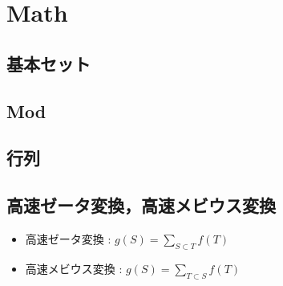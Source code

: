 \section{Math}

\subsection{基本セット}


\subsection{Mod}


\subsection{行列}



\subsection{高速ゼータ変換，高速メビウス変換}
\begin{itemize}
  \item 高速ゼータ変換 : $g(S) = \displaystyle\sum_{S \subset T} f(T)$
  \item 高速メビウス変換 : $g(S) = \displaystyle\sum_{T \subset S} f(T)$
\end{itemize}

